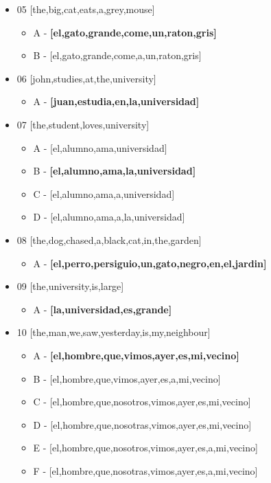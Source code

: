 \documentclass{article}
\begin{document}
\begin{itemize}
    \item 05 [the,big,cat,eats,a,grey,mouse]
    \begin{itemize}
        \item A - \textbf{[el,gato,grande,come,un,raton,gris]}
        \item B - [el,gato,grande,come,a,un,raton,gris]
    \end{itemize}

    \item 06 [john,studies,at,the,university]
    \begin{itemize}
        \item A - \textbf{[juan,estudia,en,la,universidad]}
    \end{itemize}

    \item 07 [the,student,loves,university]
    \begin{itemize}
        \item A - [el,alumno,ama,universidad]
        \item B - \textbf{[el,alumno,ama,la,universidad]}
        \item C - [el,alumno,ama,a,universidad]
        \item D - [el,alumno,ama,a,la,universidad]
    \end{itemize}

    \item 08 [the,dog,chased,a,black,cat,in,the,garden]
    \begin{itemize}
        \item A - \textbf{[el,perro,persiguio,un,gato,negro,en,el,jardin]}
    \end{itemize}

    \item 09 [the,university,is,large]
    \begin{itemize}
        \item A - \textbf{[la,universidad,es,grande]}
    \end{itemize}

    \item 10 [the,man,we,saw,yesterday,is,my,neighbour]
    \begin{itemize}
        \item A - \textbf{[el,hombre,que,vimos,ayer,es,mi,vecino]}
        \item B - [el,hombre,que,vimos,ayer,es,a,mi,vecino]
        \item C - [el,hombre,que,nosotros,vimos,ayer,es,mi,vecino]
        \item D - [el,hombre,que,nosotras,vimos,ayer,es,mi,vecino]
        \item E - [el,hombre,que,nosotros,vimos,ayer,es,a,mi,vecino]
        \item F - [el,hombre,que,nosotras,vimos,ayer,es,a,mi,vecino]
    \end{itemize}


\end{itemize}
\end{document}
